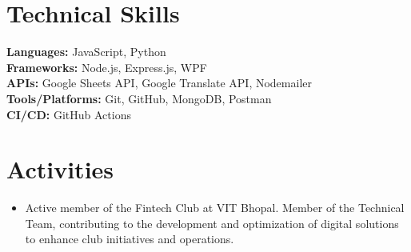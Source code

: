 \documentclass[letterpaper,11pt]{article}
\newcommand{\resumeItem}[1]{
  \item\small{
    {#1 \vspace{-2pt}}
  }
}
\newcommand{\resumeItemListStart}{\begin{itemize}}
\newcommand{\resumeItemListEnd}{\end{itemize}\vspace{-5pt}}
\begin{document}
\section{Technical Skills}
 \begin{itemize}[leftmargin=0.15in, label={}]
    \small{\item{
        \textbf{Languages:} JavaScript, Python \\
        \textbf{Frameworks:} Node.js, Express.js, WPF \\
        \textbf{APIs:} Google Sheets API, Google Translate API, Nodemailer \\
        \textbf{Tools/Platforms:} Git, GitHub, MongoDB, Postman \\
        \textbf{CI/CD:} GitHub Actions
        
    }}
 \end{itemize}

\section{Activities}
    \resumeItemListStart
        \resumeItem{Active member of the Fintech Club at VIT Bhopal. Member of the Technical Team, contributing to the development and optimization of digital solutions to enhance club initiatives and operations.}
    \resumeItemListEnd
\end{document}
